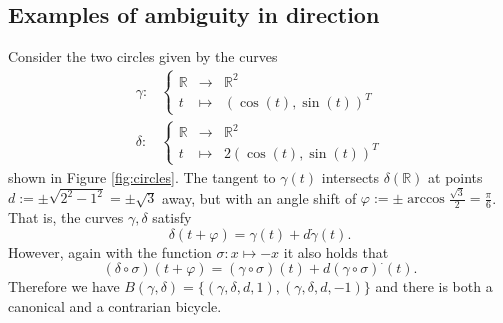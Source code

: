 \documentclass[11pt]{article}
\begin{document}
\subsection{Examples of ambiguity in direction}

\begin{example}\label{exa:circle}
Consider the two circles given by the curves \begin{align*}
\gamma:&
    \left\{
    \begin{array}{ccl}
        \mathbb R& \to & \mathbb R^2 \\
        t & \mapsto & (\cos(t),\sin(t))^T
     \end{array}
     \right.
     \\
\delta:&
    \left\{
    \begin{array}{ccl}
        \mathbb R & \to & \mathbb R^2 \\
        t & \mapsto & 2(\cos(t),\sin(t))^T
     \end{array}
     \right.
\end{align*}
 shown in Figure \ref{fig:circles}. The tangent to $\gamma(t)$ intersects $\delta(\mathbb R)$ at points $d:= \pm \sqrt{2^2-1^2} = \pm \sqrt3$ away, but with an angle shift of $\varphi := \pm \arccos\frac{\sqrt3}2 = \frac\pi6$. That is, the curves $\gamma, \delta$ satisfy $$\delta(t+\varphi) = \gamma(t) + d\dot\gamma(t).$$ However, again with the function $\sigma: x\mapsto -x$ it also holds that $$(\delta\circ \sigma)(t+\varphi) = (\gamma\circ \sigma)(t) + d (\gamma\circ\sigma)^\cdot(t).$$ Therefore we have $B(\gamma, \delta)= \{(\gamma, \delta, d,1), (\gamma, \delta, d,-1)\}$ and there is both a canonical and a contrarian bicycle.
\end{example}
\end{document}
